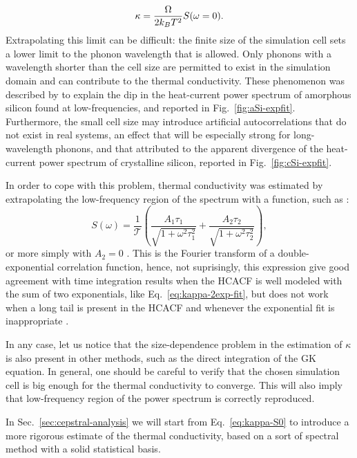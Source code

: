 \begin{LEtext}
\begin{equation}
    \kappa = \frac{\rOmega}{2k_B T^2} S (\omega=0). \label{eq:kappa-S0}
\end{equation}
Extrapolating this limit can be difficult: the finite size of the simulation cell sets a lower limit to the phonon wavelength that is allowed. Only phonons with a wavelength shorter than the cell size are permitted to exist in the simulation domain and can contribute to the thermal conductivity. These phenomenon was described by \citet{Lee1991} to explain the dip in the heat-current power spectrum of amorphous silicon found at low-frequencies, and reported in Fig.~\ref{fig:aSi-expfit}.
Furthermore, the small cell size may introduce artificial autocorrelations that do not exist in real systems, an effect that will be especially strong for long-wavelength phonons, and that \citet{Volz2000} attributed to the apparent divergence of the heat-current power spectrum of crystalline silicon, reported in Fig.~\ref{fig:cSi-expfit}.

In order to cope with this problem, thermal conductivity was estimated by extrapolating the low-frequency region of the spectrum with a function, such as \cite{Hirosaki2002}:
\begin{equation}
    S(\omega) = \frac{1}{\mathcal{T}} \left(\frac{A_1\tau_1}{\sqrt{1+\omega^2\tau_1^2}} + \frac{A_2\tau_2}{\sqrt{1+\omega^2\tau_2^2}} \right) ,
\end{equation}
or more simply with $A_2=0$ \cite{Lee1991,Volz2000}. 
This is the Fourier transform of a double-exponential correlation function, hence, not suprisingly, this expression give good agreement with time integration results when the HCACF is well modeled with the sum of two exponentials, like Eq.~\eqref{eq:kappa-2exp-fit}, but does not work when a long tail is present in the HCACF and whenever the exponential fit is inappropriate \cite{Schelling2002}. 

In any case, let us notice that the size-dependence problem in the estimation of $\kappa$ is also present in other methods, such as the direct integration of the GK equation. In general, one should be careful to verify that the chosen simulation cell is big enough for the thermal conductivity to converge. This will also imply that low-frequency region of the power spectrum is correctly reproduced. 

In Sec.~\ref{sec:cepstral-analysis} we will start from Eq.~\eqref{eq:kappa-S0} to introduce a more rigorous estimate of the thermal conductivity, based on a sort of spectral method with a solid statistical basis.



\end{LEtext}
